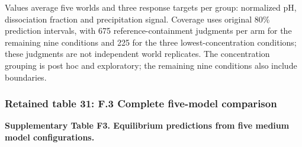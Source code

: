 \documentclass[10pt,a4paper]{article}
\begin{document}
Values average five worlds and three response targets per group: normalized pH, dissociation fraction and precipitation signal. Coverage uses original 80\% prediction intervals, with 675 reference-containment judgments per arm for the remaining nine conditions and 225 for the three lowest-concentration conditions; these judgments are not independent world replicates. The concentration grouping is post hoc and exploratory; the remaining nine conditions also include boundaries.

\subsubsection{Retained table 31: F.3 Complete five-model comparison}\label{retained-table-31-f.3-complete-five-model-comparison}

\textbf{Supplementary Table F3. Equilibrium predictions from five medium model configurations.}
\end{document}
